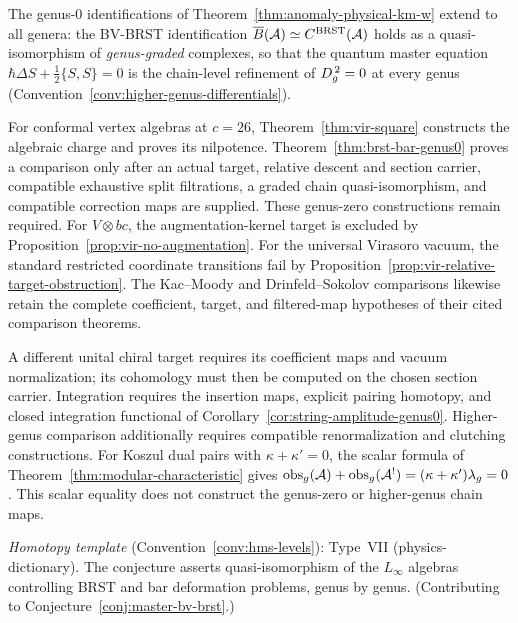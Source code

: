 \begin{conjecture}\label{conj:anomaly-physical}
The genus-$0$ identifications of
Theorem~\textup{\ref{thm:anomaly-physical-km-w}} extend to all
genera: the BV-BRST identification
$\overline{B}(\mathcal{A}) \simeq C^{\mathrm{BRST}}(\mathcal{A})$ holds as a
quasi-isomorphism of \emph{genus-graded} complexes, so that the
quantum master equation
$\hbar \Delta S + \tfrac{1}{2}\{S, S\} = 0$ is the chain-level
refinement of $D_{g}^{\,2} = 0$ at every genus
\textup{(}Convention~\textup{\ref{conv:higher-genus-differentials})}.
\end{conjecture}

\begin{remark}[Scope]\label{rem:anomaly-scope}
For conformal vertex algebras at $c=26$, Theorem~\ref{thm:vir-square} constructs the algebraic charge and proves its nilpotence.
Theorem~\ref{thm:brst-bar-genus0} proves a comparison only after an actual target, relative descent and section carrier, compatible exhaustive split filtrations, a graded chain quasi-isomorphism, and compatible correction maps are supplied.
These genus-zero constructions remain required.
For $V\otimes bc$, the augmentation-kernel target is excluded by Proposition~\ref{prop:vir-no-augmentation}.
For the universal Virasoro vacuum, the standard restricted coordinate transitions fail by Proposition~\ref{prop:vir-relative-target-obstruction}.
The Kac--Moody and Drinfeld--Sokolov comparisons likewise retain the complete coefficient, target, and filtered-map hypotheses of their cited comparison theorems.

A different unital chiral target requires its coefficient maps and vacuum normalization; its cohomology must then be computed on the chosen section carrier.
Integration requires the insertion maps, explicit pairing homotopy, and closed integration functional of Corollary~\ref{cor:string-amplitude-genus0}.
Higher-genus comparison additionally requires compatible renormalization and clutching constructions.
For Koszul dual pairs with $\kappa+\kappa'=0$, the scalar formula of Theorem~\ref{thm:modular-characteristic} gives
$\mathrm{obs}_g(\mathcal{A})+\mathrm{obs}_g(\mathcal{A}^!)=(\kappa+\kappa')\lambda_g=0$.
This scalar equality does not construct the genus-zero or higher-genus chain maps.

\emph{Homotopy template} (Convention~\ref{conv:hms-levels}): Type~VII (physics-dictionary).
The conjecture asserts quasi-isomorphism of the $L_\infty$ algebras
controlling BRST and bar deformation problems, genus by genus.
(Contributing to Conjecture~\ref{conj:master-bv-brst}.)
\end{remark}

